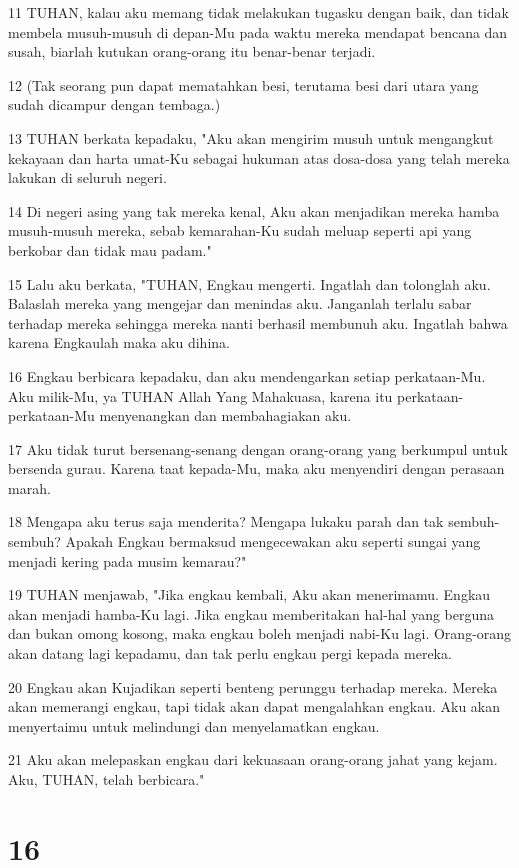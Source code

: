 \par 11 TUHAN, kalau aku memang tidak melakukan tugasku dengan baik, dan tidak membela musuh-musuh di depan-Mu pada waktu mereka mendapat bencana dan susah, biarlah kutukan orang-orang itu benar-benar terjadi.
\par 12 (Tak seorang pun dapat mematahkan besi, terutama besi dari utara yang sudah dicampur dengan tembaga.)
\par 13 TUHAN berkata kepadaku, "Aku akan mengirim musuh untuk mengangkut kekayaan dan harta umat-Ku sebagai hukuman atas dosa-dosa yang telah mereka lakukan di seluruh negeri.
\par 14 Di negeri asing yang tak mereka kenal, Aku akan menjadikan mereka hamba musuh-musuh mereka, sebab kemarahan-Ku sudah meluap seperti api yang berkobar dan tidak mau padam."
\par 15 Lalu aku berkata, "TUHAN, Engkau mengerti. Ingatlah dan tolonglah aku. Balaslah mereka yang mengejar dan menindas aku. Janganlah terlalu sabar terhadap mereka sehingga mereka nanti berhasil membunuh aku. Ingatlah bahwa karena Engkaulah maka aku dihina.
\par 16 Engkau berbicara kepadaku, dan aku mendengarkan setiap perkataan-Mu. Aku milik-Mu, ya TUHAN Allah Yang Mahakuasa, karena itu perkataan-perkataan-Mu menyenangkan dan membahagiakan aku.
\par 17 Aku tidak turut bersenang-senang dengan orang-orang yang berkumpul untuk bersenda gurau. Karena taat kepada-Mu, maka aku menyendiri dengan perasaan marah.
\par 18 Mengapa aku terus saja menderita? Mengapa lukaku parah dan tak sembuh-sembuh? Apakah Engkau bermaksud mengecewakan aku seperti sungai yang menjadi kering pada musim kemarau?"
\par 19 TUHAN menjawab, "Jika engkau kembali, Aku akan menerimamu. Engkau akan menjadi hamba-Ku lagi. Jika engkau memberitakan hal-hal yang berguna dan bukan omong kosong, maka engkau boleh menjadi nabi-Ku lagi. Orang-orang akan datang lagi kepadamu, dan tak perlu engkau pergi kepada mereka.
\par 20 Engkau akan Kujadikan seperti benteng perunggu terhadap mereka. Mereka akan memerangi engkau, tapi tidak akan dapat mengalahkan engkau. Aku akan menyertaimu untuk melindungi dan menyelamatkan engkau.
\par 21 Aku akan melepaskan engkau dari kekuasaan orang-orang jahat yang kejam. Aku, TUHAN, telah berbicara."

\chapter{16}

